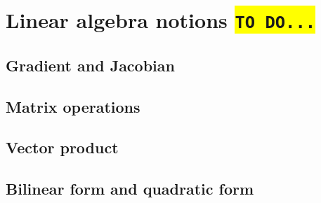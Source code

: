 \chapter{Linear algebra notions \colorbox{yellow}{\texttt{TO DO...}}}
\section{Gradient and Jacobian}
\section{Matrix operations}
\section{Vector product}
\section{Bilinear form and quadratic form}